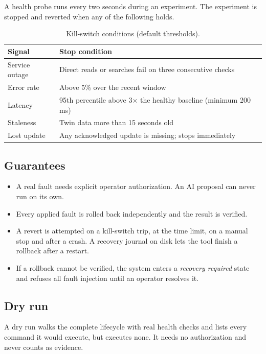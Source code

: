 \documentclass[11pt,a4paper]{article}
\begin{document}
A health probe runs every two seconds during an experiment. The experiment is
stopped and reverted when any of the following holds.

\begin{table}[h]
\centering
\begin{tabularx}{\textwidth}{@{}lL@{}}
\toprule
\textbf{Signal} & \textbf{Stop condition} \\
\midrule
Service outage & Direct reads or searches fail on three consecutive checks \\
Error rate & Above 5\% over the recent window \\
Latency & 95th percentile above 3$\times$ the healthy baseline (minimum 200 ms) \\
Staleness & Twin data more than 15 seconds old \\
Lost update & Any acknowledged update is missing; stops immediately \\
\bottomrule
\end{tabularx}
\caption{Kill-switch conditions (default thresholds).}
\end{table}

\subsection{Guarantees}

\begin{itemize}
  \item A real fault needs explicit operator authorization. An AI proposal can
        never run on its own.
  \item Every applied fault is rolled back independently and the result is
        verified.
  \item A revert is attempted on a kill-switch trip, at the time limit, on a
        manual stop and after a crash. A recovery journal on disk lets the
        tool finish a rollback after a restart.
  \item If a rollback cannot be verified, the system enters a
        \emph{recovery required} state and refuses all fault injection until
        an operator resolves it.
\end{itemize}

\subsection{Dry run}

A dry run walks the complete lifecycle with real health checks and lists every
command it would execute, but executes none. It needs no authorization and
never counts as evidence.
\end{document}

